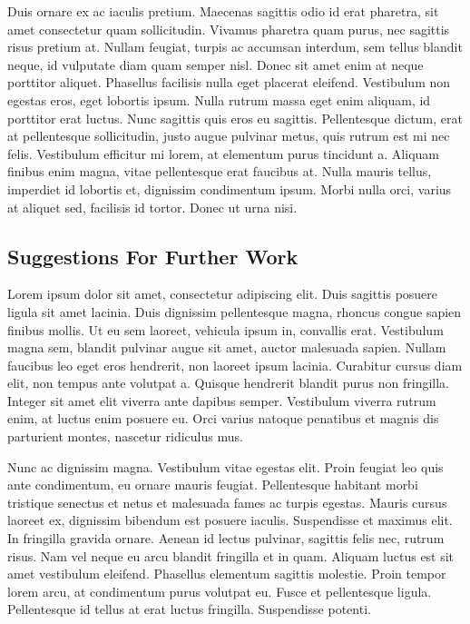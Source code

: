 \documentclass[
]{article}
\begin{document}
Duis ornare ex ac iaculis pretium. Maecenas sagittis odio id erat
pharetra, sit amet consectetur quam sollicitudin. Vivamus pharetra quam
purus, nec sagittis risus pretium at. Nullam feugiat, turpis ac accumsan
interdum, sem tellus blandit neque, id vulputate diam quam semper nisl.
Donec sit amet enim at neque porttitor aliquet. Phasellus facilisis
nulla eget placerat eleifend. Vestibulum non egestas eros, eget lobortis
ipsum. Nulla rutrum massa eget enim aliquam, id porttitor erat luctus.
Nunc sagittis quis eros eu sagittis. Pellentesque dictum, erat at
pellentesque sollicitudin, justo augue pulvinar metus, quis rutrum est
mi nec felis. Vestibulum efficitur mi lorem, at elementum purus
tincidunt a. Aliquam finibus enim magna, vitae pellentesque erat
faucibus at. Nulla mauris tellus, imperdiet id lobortis et, dignissim
condimentum ipsum. Morbi nulla orci, varius at aliquet sed, facilisis id
tortor. Donec ut urna nisi.

\subsection{Suggestions For Further
Work}\label{suggestions-for-further-work}

Lorem ipsum dolor sit amet, consectetur adipiscing elit. Duis sagittis
posuere ligula sit amet lacinia. Duis dignissim pellentesque magna,
rhoncus congue sapien finibus mollis. Ut eu sem laoreet, vehicula ipsum
in, convallis erat. Vestibulum magna sem, blandit pulvinar augue sit
amet, auctor malesuada sapien. Nullam faucibus leo eget eros hendrerit,
non laoreet ipsum lacinia. Curabitur cursus diam elit, non tempus ante
volutpat a. Quisque hendrerit blandit purus non fringilla. Integer sit
amet elit viverra ante dapibus semper. Vestibulum viverra rutrum enim,
at luctus enim posuere eu. Orci varius natoque penatibus et magnis dis
parturient montes, nascetur ridiculus mus.

Nunc ac dignissim magna. Vestibulum vitae egestas elit. Proin feugiat
leo quis ante condimentum, eu ornare mauris feugiat. Pellentesque
habitant morbi tristique senectus et netus et malesuada fames ac turpis
egestas. Mauris cursus laoreet ex, dignissim bibendum est posuere
iaculis. Suspendisse et maximus elit. In fringilla gravida ornare.
Aenean id lectus pulvinar, sagittis felis nec, rutrum risus. Nam vel
neque eu arcu blandit fringilla et in quam. Aliquam luctus est sit amet
vestibulum eleifend. Phasellus elementum sagittis molestie. Proin tempor
lorem arcu, at condimentum purus volutpat eu. Fusce et pellentesque
ligula. Pellentesque id tellus at erat luctus fringilla. Suspendisse
potenti.
\end{document}
